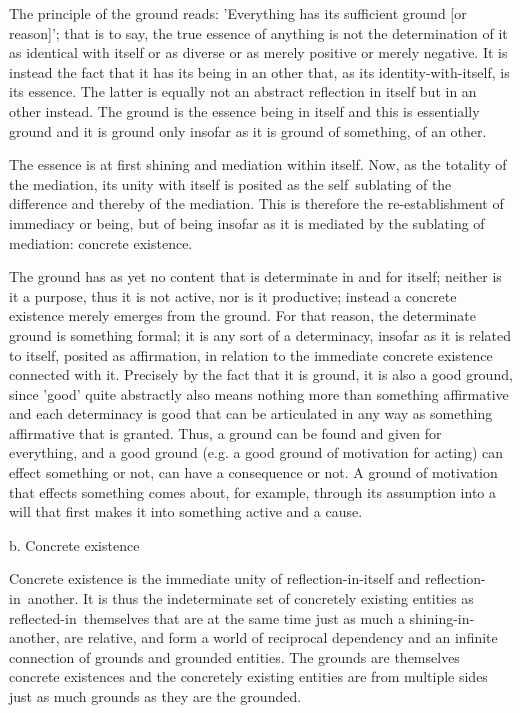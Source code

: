     The principle of the ground reads:
    'Everything has its sufficient ground [or reason]';
    that is to say, the true essence of anything is not
    the determination of it as identical with itself or
    as diverse or as merely positive or merely negative.
    It is instead the fact that it has its being in an other that,
    as its identity-with-itself, is its essence.
    The latter is equally not an abstract reflection
    in itself but in an other instead.
    The ground is the essence being in itself and
    this is essentially ground and it is ground only
    insofar as it is ground of something, of an other.

The essence is at first shining and mediation within itself.
Now, as the totality of the mediation, its unity with itself is posited
as the self~sublating of the difference and thereby of the mediation.
This is therefore the re-establishment of immediacy or being,
but of being insofar as it is mediated by the sublating of mediation:
concrete existence.

    The ground has as yet no content that is determinate in and for itself;
    neither is it a purpose, thus it is not active, nor is it productive;
    instead a concrete existence merely emerges from the ground.
    For that reason, the determinate ground is something formal;
    it is any sort of a determinacy,
    insofar as it is related to itself, posited as affirmation,
    in relation to the immediate concrete existence connected with it.
    Precisely by the fact that it is ground, it is also a good ground,
    since 'good' quite abstractly also means nothing more than something
    affirmative and each determinacy is good that can be articulated in
    any way as something affirmative that is granted.
    Thus, a ground can be found and given for everything,
    and a good ground (e.g. a good ground of motivation for acting)
    can effect something or not, can have a consequence or not.
    A ground of motivation that effects something comes about,
    for example, through its assumption into a will that
    first makes it into something active and a cause.

b. Concrete existence

Concrete existence is the immediate unity of
reflection-in-itself and reflection-in~another.
It is thus the indeterminate set of concretely
existing entities as reflected-in~themselves
that are at the same time just as much
a shining-in-another, are relative, and
form a world of reciprocal dependency and
an infinite connection of grounds and grounded entities.
The grounds are themselves concrete existences and
the concretely existing entities are from multiple sides
just as much grounds as they are the grounded.

